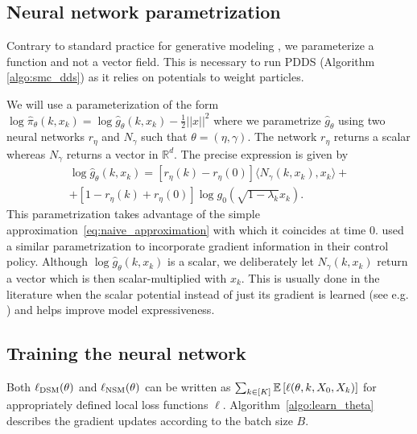 \documentclass{article}
\theoremstyle{plain}
\theoremstyle{definition}
\theoremstyle{remark}
\begin{document}
\subsection{Neural network parametrization}
\label{sec:nn_param}
Contrary to standard practice for generative modeling \cite{ho2020denoising,song2020score}, we parameterize a function and not a vector field. This is necessary to run PDDS (Algorithm \ref{algo:smc_dds}) as it relies on potentials to weight particles.

We will use a parameterization of the form $\log \hat \pi_\theta(k,x_k)=\log \hat g_\theta(k,x_k)-\tfrac{1}{2}||x||^2$ where we parametrize $\hat g_\theta$ using two neural networks $r_\eta$ and $N_\gamma$ such that $\theta = (\eta, \gamma)$. The network $r_\eta$ returns a scalar whereas $N_\gamma$ returns a vector in $\mathbb R^d$. The precise expression is given by
\begin{multline*}
	\log \hat g_\theta(k, x_k) = \left[r_\eta(k) - r_\eta(0) \right] \langle N_\gamma(k, x_k), x_k \rangle +\\+ \left[ 1 - r_\eta(k) + r_\eta(0) \right] \log g_0(\sqrt{1 - \lambda_k} x_k).
\end{multline*}
This parametrization takes advantage of the simple approximation~\eqref{eq:naive_approximation} with which it coincides at time $0$. \citet{zhangyongxinchen2021path} used a similar parametrization to incorporate gradient information in their control policy. Although $\log \hat g_\theta(k, x_k)$ is a scalar, we deliberately let $N_\gamma(k, x_k)$ return a vector which is then scalar-multiplied with $x_k$. This is usually done in the literature when the scalar potential instead of just its gradient is learned (see e.g. \citealp{salimans2021should}) and helps improve model expressiveness.

\subsection{Training the neural network}
\label{subsect:iterative}

Both $\ell_{\textup{DSM}}(\theta)$ and $\ell_{\textup{NSM}}(\theta)$ can be written as $\sum_{k\in[K]} \mathbb{E}\left[ \ell(\theta,k, X_0, X_k) \right]$ for appropriately defined local loss functions $\ell$. Algorithm~\ref{algo:learn_theta} describes the gradient updates according to the batch size $B$.
\end{document}
